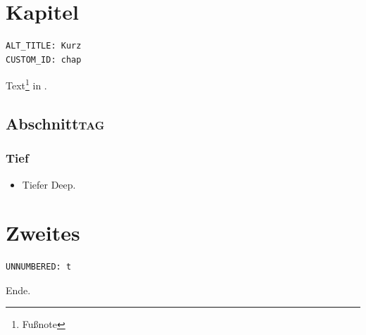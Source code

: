 \part[Kurz]{Kapitel}
\label{sec:org1c59b52}
\begin{verbatim}
ALT_TITLE: Kurz
CUSTOM_ID: chap
\end{verbatim}
Text\footnote{Fußnote} in \ref{sec:org1c59b52}.
\chapter{Abschnitt\hfill{}\textsc{tag}}
\label{sec:org1f85fd9}
\section*{Tief}
\label{sec:org47118c0}
\begin{itemize}
\item Tiefer
\label{sec:orgaf3ed89}
Deep.
\end{itemize}
\part*{Zweites}
\label{sec:org0e4d337}
\begin{verbatim}
UNNUMBERED: t
\end{verbatim}
Ende.
